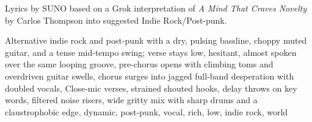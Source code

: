 
\begin{notes}
Lyrics by SUNO based on a Grok interpretation of \emph{A Mind That Craves Novelty} by Carlos Thompson into suggested Indie Rock/Post-punk.
\end{notes}
\begin{style}
Alternative indie rock and post-punk with a dry, pulsing bassline, choppy muted guitar, and a tense mid-tempo swing; verse stays low, hesitant, almost spoken over the same looping groove, pre-chorus opens with climbing toms and overdriven guitar swells, chorus surges into jagged full-band desperation with doubled vocals, Close-mic verses, strained shouted hooks, delay throws on key words, filtered noise risers, wide gritty mix with sharp drums and a claustrophobic edge, dynamic, post-punk, vocal, rich, low, indie rock, world
\end{style}
